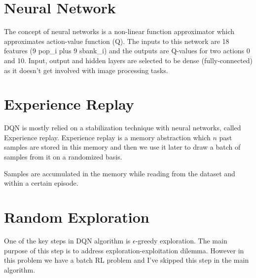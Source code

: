 \documentclass[12pt]{report}
\begin{document}
\section{Neural Network}
The concept of neural networks is a non-linear function approximator \cite{Bengio2009} which approximates action-value function (Q). The inputs to this network are 18 features (9 pop\_i plus 9 sbank\_i) and the outputs are Q-values for two actions 0 and 10. Input, output and hidden layers are selected to be dense (fully-connected) as it doesn't get involved with image processing tasks.

\section{Experience Replay}
DQN is mostly relied on a stabilization technique with neural networks, called Experience replay. Experience replay is a memory abstraction which $n$ past samples are stored in this memory and then we use it later to draw a batch of samples from it on a randomized basis.

Samples are accumulated in the memory while reading from the dataset and within a certain episode.


\section{Random Exploration}
One of the key steps in DQN algorithm is $\epsilon$-greedy exploration. The main purpose of this step is to address exploration-exploitation dilemma. However in this problem we have a batch RL problem and I've skipped this step in the main algorithm.





\end{document}
